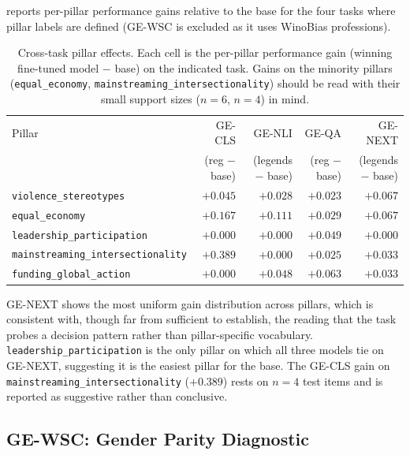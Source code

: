 \documentclass[pdflatex, sn-apa]{sn-jnl}%
\theoremstyle{thmstyleone}%
\theoremstyle{thmstyletwo}%
\theoremstyle{thmstylethree}%
\begin{document}
 reports per-pillar performance gains relative to the
base for the four tasks where pillar labels are defined (GE-WSC is
excluded as it uses WinoBias professions).

\begin{table}[h]
\centering
\caption{Cross-task pillar effects. Each cell is the per-pillar
performance gain (winning fine-tuned model $-$ base) on the indicated
task. Gains on the minority pillars (\texttt{equal\_economy},
\texttt{mainstreaming\_intersectionality}) should be read with their
small support sizes ($n=6$, $n=4$) in mind.}
\label{tab:pillars}
\small
\begin{tabular}{@{}lrrrr@{}}
\toprule
Pillar                                & GE-CLS        & GE-NLI        & GE-QA         & GE-NEXT       \\
                                      & (reg $-$ base)& (legends $-$ base) & (reg $-$ base) & (legends $-$ base) \\
\midrule
\texttt{violence\_stereotypes}        & $+0.045$      & $+0.028$      & $+0.023$      & $+0.067$      \\
\texttt{equal\_economy}               & $+0.167$      & $+0.111$      & $+0.029$      & $+0.067$      \\
\texttt{leadership\_participation}    & $+0.000$      & $+0.000$      & $+0.049$      & $+0.000$      \\
\texttt{mainstreaming\_intersectionality} & $+0.389$  & $+0.000$      & $+0.025$      & $+0.033$      \\
\texttt{funding\_global\_action}      & $+0.000$      & $+0.048$      & $+0.063$      & $+0.033$      \\
\bottomrule
\end{tabular}
\end{table}

GE-NEXT shows the most uniform gain distribution across pillars, which
is consistent with, though far from sufficient to establish, the
reading that the task probes a decision pattern rather than
pillar-specific vocabulary. \texttt{leadership\_participation} is the
only pillar on which all three models tie on GE-NEXT, suggesting it is
the easiest pillar for the base. The GE-CLS gain on
\texttt{mainstreaming\_intersectionality} ($+0.389$) rests on $n=4$
test items and is reported as suggestive rather than conclusive.

\subsection{GE-WSC: Gender Parity Diagnostic}
\label{sec:results:wsc}
\end{document}
